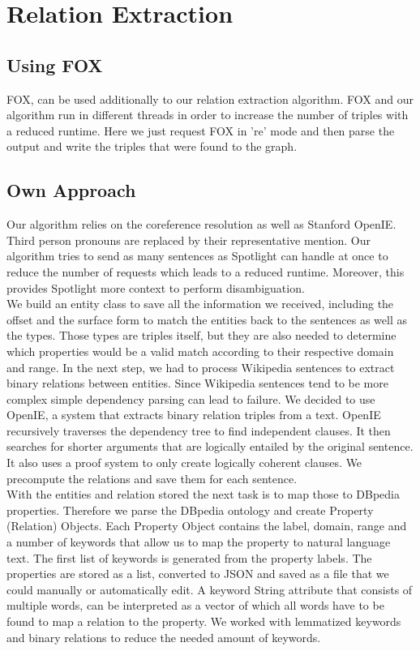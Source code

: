 \documentclass[runningheads]{llncs}
\begin{document}
\section{Relation Extraction}

\subsection{Using FOX}
FOX, can be used additionally to our relation extraction algorithm. FOX and our algorithm run in different threads in order to increase the number of triples with a reduced runtime. Here we just request FOX in 're' mode and then parse the output and write the triples that were found to the graph.
\subsection{Own Approach}
Our algorithm relies on the coreference resolution as well as Stanford OpenIE.
Third person pronouns are replaced by their representative mention. Our algorithm tries to send as many sentences as Spotlight can handle at once to reduce the number of requests which leads to a reduced runtime. Moreover, this provides Spotlight more context to perform disambiguation. \\

We build an entity class to save all the information we received, including the offset and the surface form to match the entities back to the sentences as well as the types. Those types are triples itself, but they are also needed to determine which properties would be a valid match according to their respective domain and range.
In the next step, we had to process Wikipedia sentences to extract binary relations between entities. Since Wikipedia sentences tend to be more complex simple dependency parsing can lead to failure.
We decided to use OpenIE, a system that extracts binary relation triples from a text. OpenIE recursively traverses the dependency tree to find independent clauses. It then searches for shorter arguments that are logically entailed by the original sentence. It also uses a proof system to only create logically coherent clauses.
We precompute the relations and save them for each sentence. \\

With the entities and relation stored the next task is to map those to DBpedia properties. Therefore we parse the DBpedia ontology and create Property (Relation) Objects. Each Property Object contains the label, domain, range and a number of keywords that allow us to map the property to natural language text. The first list of keywords is generated from the property labels. 
The properties are stored as a list, converted to JSON and saved as a file that we could manually or automatically edit.
A keyword String attribute that consists of multiple words, can be interpreted as a vector of which all words have to be found to map a relation to the property. We worked with lemmatized keywords and binary relations to reduce the needed amount of keywords. \\
\end{document}
